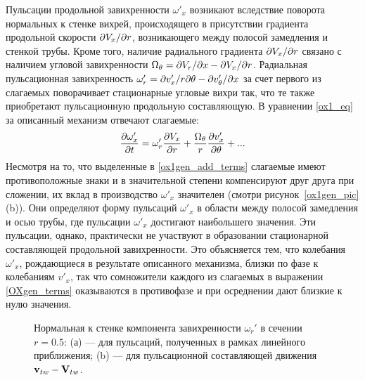 Пульсации продольной завихренности $\omega'_x$ возникают вследствие поворота нормальных к стенке вихрей, происходящего в присутствии градиента продольной скорости $\partial V_x/ \partial r$, возникающего между полосой замедления и стенкой трубы. Кроме того, наличие радиального градиента $\partial V_x/ \partial r$ связано с наличием угловой завихренности $\Omega_\theta = \partial V_r / \partial x - \partial V_x / \partial r$. Радиальная пульсационная завихренность $\omega'_r = \partial v'_x / r \partial \theta - \partial v'_\theta / \partial x$ за счет первого из слагаемых поворачивает стационарные угловые вихри так, что те также приобретают пульсационную продольную составляющую. В уравнении \eqref{ox1_eq} за описанный механизм отвечают слагаемые:
\begin{equation}\label{ox1gen_add_terms}
\frac{\partial \omega'_x}{\partial t} = \omega'_r \frac {\partial V_x}{\partial r} + \frac{\Omega_\theta}{r} \frac{\partial v'_x}{\partial \theta} + ...
\end{equation}
Несмотря на то, что выделенные в \eqref{ox1gen_add_terms} слагаемые имеют противоположные знаки и в значительной степени компенсируют друг друга при сложении, их вклад в производство $\omega'_x$ значителен (смотри рисунок~\ref{ox1gen_pic}(b)). Они определяют форму пульсаций $\omega'_x$ в области между полосой замедления и осью трубы, где пульсации $\omega'_x$ достигают наибольшего значения. Эти пульсации, однако, практически не участвуют в образовании стационарной составляющей продольной завихренности. Это объясняется тем, что колебания $\omega'_x$, рождающиеся в результате описанного механизма, близки по фазе к колебаниям $v'_x$, так что сомножители каждого из слагаемых в выражении \eqref{OXgen_terms} оказываются в противофазе и при осреднении дают близкие к нулю значения.

\begin{figure}
\caption{Нормальная к стенке компонента завихренности $\omega_r'$ в сечении $r = 0.5$: (а) --- для пульсаций, полученных в рамках линейного приближения; (b) --- для пульсационной составляющей движения $\mathbf{v}_{tw} - \mathbf{V}_{tw}$. }
\label{pipetw_or1_pic}
\end{figure}

